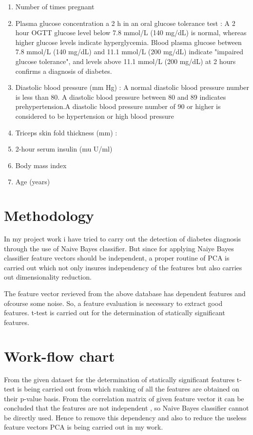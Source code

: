 \begin{enumerate}
  \item Number of times pregnant
 \item Plasma glucose concentration a 2 h in an oral glucose tolerance test : A 2 hour OGTT glucose level below 7.8 mmol/L (140 mg/dL) is normal, whereas higher glucose levels indicate hyperglycemia. Blood plasma glucose between 7.8 mmol/L (140 mg/dL) and 11.1 mmol/L (200 mg/dL) indicate "impaired glucose tolerance", and levels above 11.1 mmol/L (200 mg/dL) at 2 hours confirms a diagnosis of diabetes.
  \item Diastolic blood pressure (mm Hg) : A normal diastolic blood pressure number is less than 80.
A diastolic blood pressure between 80 and 89 indicates prehypertension.A diastolic blood pressure number of 90 or higher is considered to be hypertension or high blood pressure
  \item Triceps skin fold thickness (mm) :
  \item 2-hour serum insulin (mu U/ml)
  \item Body mass index 
  \item Age (years)
\end{enumerate}

\section{Methodology}
In my project work i have tried to carry out the detection of diabetes diagnosis through the use of Naive Bayes classifier.
But since for applying Naiye Bayes classifier feature vectors should be independent, a proper routine of PCA is carried out which not only insures independency of the features but also carries out dimensionality reduction.

The feature vector revieved from the above database has dependent features and ofcourse some noise. So, a feature evaluation is necessary to extract good features. t-test is carried out for the determination of statically significant features.

\section{Work-flow chart}
\label{S:2}
From the given dataset for the determination of statically significant features t-test is being carried out from which ranking of all the features are obtained on their p-value basis. From the correlation matrix of given feature vector it can be concluded that the features are not independent , so Naive Bayes classifier cannot be directly used. Hence to remove this dependency and also to reduce the useless feature vectors PCA is being carried out in my work.

